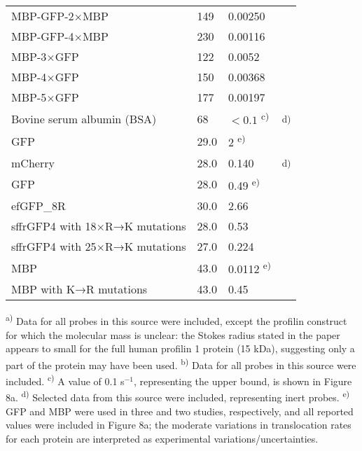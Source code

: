 \documentclass[10pt, a4paper, twocolumn]{article}
\begin{document}
\begin{table*}[h]
\begin{minipage}{\linewidth}
\begin{tabular}{p{6cm}|p{2cm}|p{3.7cm}|p{2cm}}
MBP-GFP-2$\times$MBP & 149 & 0.00250 &  \\
MBP-GFP-4$\times$MBP & 230 & 0.00116 &  \\
MBP-3$\times$GFP & 122 & 0.0052 &  \\
MBP-4$\times$GFP & 150 & 0.00368 &  \\
MBP-5$\times$GFP & 177 & 0.00197 &  \\
\hline
Bovine serum albumin (BSA) & 68 & $<0.1$ \textsuperscript{c)} & \cite{Ribbeck2001} \textsuperscript{d)} \\
GFP & 29.0 & 2 \textsuperscript{e)} &  \\
\hline
mCherry & 28.0 & 0.140 & \cite{Frey2018} \textsuperscript{d)} \\
GFP & 28.0 & 0.49 \textsuperscript{e)} &  \\
efGFP\_8R & 30.0 & 2.66 &  \\
sffrGFP4 with 18$\times$R→K mutations & 28.0 & 0.53 &  \\
sffrGFP4 with 25$\times$R→K mutations & 27.0 & 0.224 &  \\
MBP & 43.0 & 0.0112 \textsuperscript{e)} &  \\
MBP with K→R mutations & 43.0 & 0.45 &  \\
\end{tabular}
\end{minipage}
\vspace{0.5em}
\begin{minipage}{\textwidth}
\footnotesize
\textsuperscript{a)} Data for all probes in this source were included, except the profilin construct for which the molecular mass is unclear: the Stokes radius stated in the paper appears to small for the full human profilin 1 protein (15 kDa), suggesting only a part of the protein may have been used.
\textsuperscript{b)} Data for all probes in this source were included.
\textsuperscript{c)} A value of 0.1 s$^{-1}$, representing the upper bound, is shown in Figure 8a.
\textsuperscript{d)} Selected data from this source were included, representing inert probes.
\textsuperscript{e)} GFP and MBP were used in three and two studies, respectively, and all reported values were included in Figure 8a; the moderate variations in translocation rates for each protein are interpreted as experimental variations/uncertainties.
\end{minipage}
\end{table*}
\end{document}
